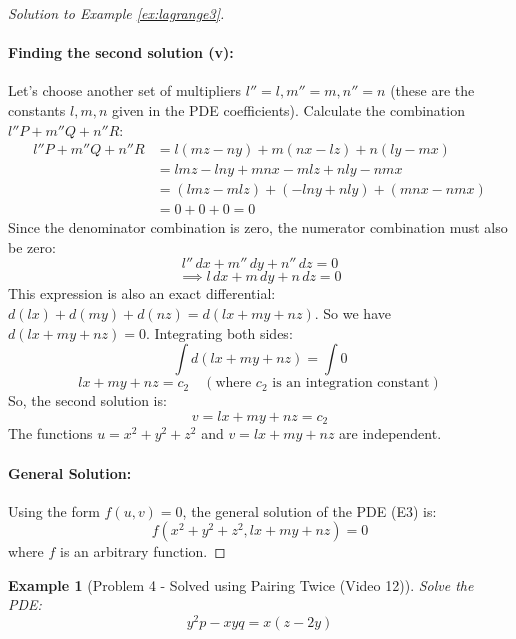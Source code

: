 \documentclass{article}
\newtheorem{example}{Example}[section]    %
\theoremstyle{remark}
\begin{document}
\begin{proof}[Solution to Example \ref{ex:lagrange3}]
		\paragraph{Finding the second solution (v):}
		Let's choose another set of multipliers $l''=l, m''=m, n''=n$ (these are the constants $l, m, n$ given in the PDE coefficients).
		Calculate the combination $l''P + m''Q + n''R$:
		\begin{align*} l''P + m''Q + n''R &= l(mz-ny) + m(nx-lz) + n(ly-mx) \\ &= lmz - lny + mnx - mlz + nly - nmx \\ &= (lmz - mlz) + (-lny + nly) + (mnx - nmx) \\ &= 0 + 0 + 0 = 0 \end{align*}
		Since the denominator combination is zero, the numerator combination must also be zero:
		\[
		l''\,dx + m''\,dy + n''\,dz = 0
		\]
		\[
		\implies l\,dx + m\,dy + n\,dz = 0
		\]
		This expression is also an exact differential: $d(lx) + d(my) + d(nz) = d(lx + my + nz)$.
		So we have $d(lx + my + nz) = 0$.
		Integrating both sides:
		\[
		\int d(lx + my + nz) = \int 0
		\]
		\[
		lx + my + nz = c_2 \quad (\text{where } c_2 \text{ is an integration constant})
		\]
		So, the second solution is:
		\[
		v = lx + my + nz = c_2
		\]
		The functions $u=x^2+y^2+z^2$ and $v=lx+my+nz$ are independent.
		
		\paragraph{General Solution:}
		Using the form $f(u, v) = 0$, the general solution of the PDE (E3) is:
		\[
		f (x^2+y^2+z^2, lx+my+nz) = 0
		\]
		where $f$ is an arbitrary function.
	\end{proof}
	
	\begin{example}[Problem 4 - Solved using Pairing Twice (Video 12)]
		\label{ex:lagrange4}
		Solve the PDE:
		\[ y^2p - xyq = x(z-2y) \]
	\end{example}
	
\end{document}
